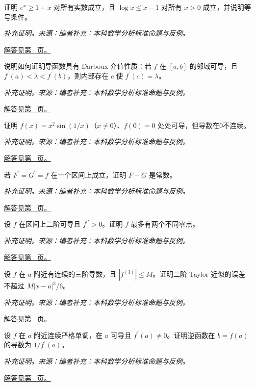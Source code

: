 \documentclass[UTF8,12pt,a4paper,fontset=fandol]{ctexart}
\begin{document}
\begin{example}[指数与对数的基本不等式]\label{ex:c7q14}
证明 $e^x\ge1+x$ 对所有实数成立，且 $\log x\le x-1$ 对所有 $x>0$ 成立，并说明等号条件。
\par\textit{补充证明。来源：编者补充：本科数学分析标准命题与反例。}\par\hyperref[ans:c7q14]{解答见第~\pageref{ans:c7q14} 页。}
\end{example}
\begin{example}[导函数的介值性]\label{ex:c7q15}
说明如何证明导函数具有 Darboux 介值性质：若 $f$ 在 $[a,b]$ 的邻域可导，且 $f^{\prime}(a)<\lambda<f^{\prime}(b)$，则内部存在 $c$ 使 $f^{\prime}(c)=\lambda$。
\par\textit{补充证明。来源：编者补充：本科数学分析标准命题与反例。}\par\hyperref[ans:c7q15]{解答见第~\pageref{ans:c7q15} 页。}
\end{example}
\begin{example}[导数不连续的可导函数]\label{ex:c7q16}
证明 $f(x)=x^2\sin(1/x)$（$x\ne0$）、$f(0)=0$ 处处可导，但导数在0不连续。
\par\textit{补充证明。来源：编者补充：本科数学分析标准命题与反例。}\par\hyperref[ans:c7q16]{解答见第~\pageref{ans:c7q16} 页。}
\end{example}
\begin{example}[两个原函数之差]\label{ex:c7q17}
若 $F^{\prime}=G^{\prime}=f$ 在一个区间上成立，证明 $F-G$ 是常数。
\par\textit{补充证明。来源：编者补充：本科数学分析标准命题与反例。}\par\hyperref[ans:c7q17]{解答见第~\pageref{ans:c7q17} 页。}
\end{example}
\begin{example}\label{ex:c7q18}
设 $f$ 在区间上二阶可导且 $f^{\prime\prime}>0$。证明 $f$ 最多有两个不同零点。
\par\textit{补充证明。来源：编者补充：本科数学分析标准命题与反例。}\par\hyperref[ans:c7q18]{解答见第~\pageref{ans:c7q18} 页。}
\end{example}
\begin{example}\label{ex:c7q19}
设 $f$ 在 $a$ 附近有连续的三阶导数，且 $|f^{(3)}|\le M$。证明二阶 Taylor 近似的误差不超过 $M|x-a|^3/6$。
\par\textit{补充证明。来源：编者补充：本科数学分析标准命题与反例。}\par\hyperref[ans:c7q19]{解答见第~\pageref{ans:c7q19} 页。}
\end{example}
\begin{example}[逆函数的导数条件]\label{ex:c7q20}
设 $f$ 在 $a$ 附近连续严格单调，在 $a$ 可导且 $f^{\prime}(a)\ne0$。证明逆函数在 $b=f(a)$ 的导数为 $1/f^{\prime}(a)$。
\par\textit{补充证明。来源：编者补充：本科数学分析标准命题与反例。}\par\hyperref[ans:c7q20]{解答见第~\pageref{ans:c7q20} 页。}
\end{example}
\end{document}
